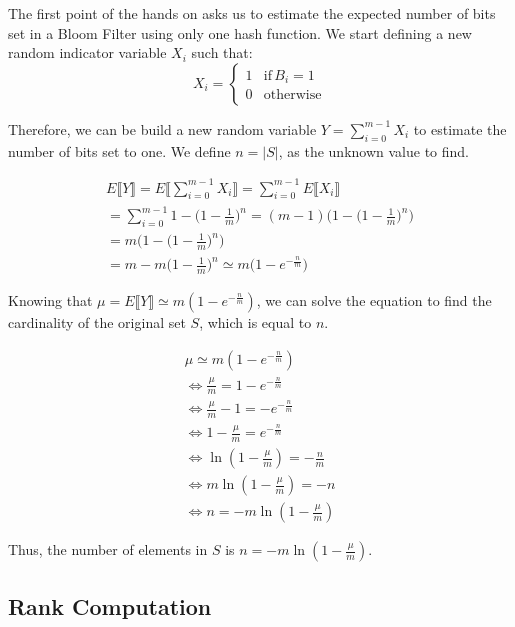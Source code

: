 \documentclass{article}
\begin{document}
The first point of the hands on asks us to estimate the expected number of bits set in a Bloom Filter using only one hash function.
We start defining a new random indicator variable $X_i$ such that:
\begin{equation}
    X_i = \begin{cases}
        1 & \textrm{if} \, B_i = 1 \\
        0 & \textrm{otherwise}
    \end{cases}
\end{equation}

\noindent Therefore, we can be build a new random variable $Y = \sum_{i = 0}^{m - 1}X_i$ to estimate the number of bits set to one. We define $n = |S|$, as the unknown value to find. 

\begin{align*}
    E \llbracket Y \rrbracket = E \bigg\llbracket  \sum_{i = 0}^{m - 1}X_i \bigg\rrbracket = \sum_{i = 0}^{m - 1} E \llbracket X_i \rrbracket \\
    = \sum_{i = 0}^{m - 1} 1 - \bigg(1 - \frac{1}{m}\bigg)^n = (m - 1)\bigg(1 - \bigg(1 - \frac{1}{m}\bigg)^n\bigg) \\
    = m\bigg(1 - \bigg(1 - \frac{1}{m}\bigg)^n\bigg) \\
    = m - m\bigg(1 - \frac{1}{m}\bigg)^n \simeq m \bigg(1 - e^{-\frac{n}{m}}\bigg)
\end{align*}

\noindent Knowing that $\mu = E \llbracket Y \rrbracket \simeq m (1 - e^{-\frac{n}{m}})$, we can solve the equation to find the cardinality of the original set $S$, which is equal to $n$.

\begin{align*}
    \mu \simeq m (1 - e^{-\frac{n}{m}}) \\
    \iff \frac{\mu}{m} = 1 - e^{-\frac{n}{m}} \\
    \iff \frac{\mu}{m} - 1 = - e^{-\frac{n}{m}} \\
    \iff 1 - \frac{\mu}{m} = e^{-\frac{n}{m}} \\
    \iff \ln (1 - \frac{\mu}{m}) = -\frac{n}{m} \\
    \iff m \ln (1 - \frac{\mu}{m}) = - n \\
    \iff n = -m \ln (1 - \frac{\mu}{m})
\end{align*}

\noindent Thus, the number of elements in $S$ is $n =  -m \ln (1 - \frac{\mu}{m})$.

\subsection{Rank Computation}
\end{document}

